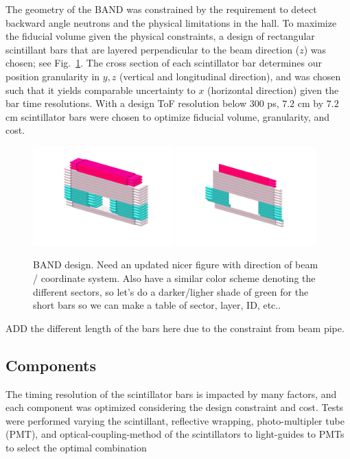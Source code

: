 \documentclass[3p,final,twocolumn]{elsarticle}
\begin{document}
The geometry of the BAND was constrained by the requirement to detect backward angle neutrons and the physical limitations in the hall. 
To maximize the fiducial volume given the physical constraints, a design of rectangular scintillant bars that are layered perpendicular to the beam direction ($z$) was chosen; see Fig.~\ref{fig:design}.
The cross section of each scintillator bar determines our position granularity in $y,z$ (vertical and longitudinal direction), and was chosen such that it yields comparable uncertainty to $x$ (horizontal direction) given the bar 
time resolutions. With a design ToF resolution below $300$ \si{\pico\second}, $7.2$ \si{\centi\meter} by $7.2$ \si{\centi\meter} scintillator bars were chosen to optimize
fiducial volume, granularity, and cost.
\begin{figure}[h]
	\centering
		\includegraphics[width=0.48\textwidth]{MAIN_DETECTOR_COLORED_2.png}
		\includegraphics[width=0.48\textwidth]{VETO_DETECTOR_COLORED_2.png}
		\caption{BAND design. Need an updated nicer figure with direction of beam / coordinate system. Also have a similar 
		color scheme denoting the different sectors, so let's do a darker/ligher shade of green for the short bars so we can make 
		a table of sector, layer, ID, etc..}
		\label{fig:design}
\end{figure}

{\color{red} ADD the different length of the bars here due to the constraint from beam pipe.}

\subsection{Components}
The timing resolution of the scintillator bars is impacted by many factors, and each component was optimized considering the design constraint and cost. Tests were 
performed varying the scintillant, reflective wrapping, photo-multipler tube (PMT), and optical-coupling-method of the scintillators to light-guides to PMTs to select the optimal combination
\end{document}

